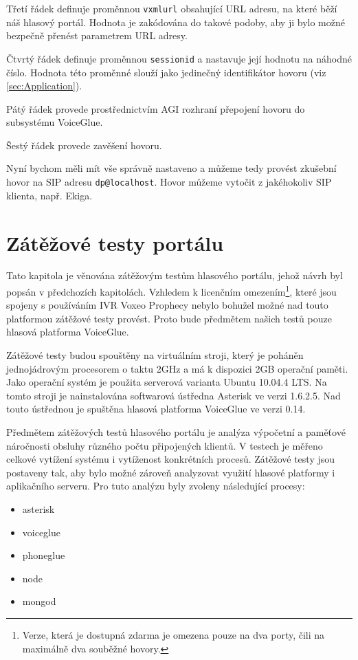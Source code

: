 \documentclass[ing,male,java,dept460,twoside]{diploma}						%
\begin{document}
Třetí řádek definuje proměnnou \texttt{vxmlurl} obsahující URL adresu, na které běží náš hlasový portál. Hodnota je zakódována do takové podoby, aby ji bylo možné bezpečně přenést parametrem URL adresy.

Čtvrtý řádek definuje proměnnou \texttt{sessionid} a nastavuje její hodnotu na náhodné číslo. Hodnota této proměnné slouží jako jedinečný identifikátor hovoru (viz \ref{sec:Application}).

Pátý řádek provede prostřednictvím AGI rozhraní přepojení hovoru do subsystému VoiceGlue.

Šestý řádek provede zavěšení hovoru.

Nyní bychom měli mít vše správně nastaveno a můžeme tedy provést zkušební hovor na SIP adresu \texttt{dp@localhost}. Hovor můžeme vytočit z jakéhokoliv SIP klienta, např. Ekiga.

\section{Zátěžové testy portálu}
\label{sec:Benchmark}
Tato kapitola je věnována zátěžovým testům hlasového portálu, jehož návrh byl popsán v předchozích kapitolách. Vzhledem k licenčním omezením\footnote{Verze, která je dostupná zdarma je omezena pouze na dva porty, čili na maximálně dva souběžné hovory.}, které jsou spojeny s používáním IVR Voxeo Prophecy nebylo bohužel možné nad touto platformou zátěžové testy provést. Proto bude předmětem našich testů pouze hlasová platforma VoiceGlue.

Zátěžové testy budou spouštěny na virtuálním stroji, který je poháněn jednojádrovým procesorem o taktu 2GHz a má k dispozici 2GB operační paměti. Jako operační systém je použita serverová varianta Ubuntu 10.04.4 LTS. Na tomto stroji je nainstalována softwarová ústředna Asterisk ve verzi 1.6.2.5. Nad touto ústřednou je spuštěna hlasová platforma VoiceGlue ve verzi 0.14.

Předmětem zátěžových testů hlasového portálu je analýza výpočetní a paměťové náročnosti obsluhy různého počtu připojených klientů. V testech je měřeno celkové vytížení systému i vytíženost konkrétních procesů. Zátěžové testy jsou postaveny tak, aby bylo možné zároveň analyzovat využití hlasové platformy i aplikačního serveru. Pro tuto analýzu byly zvoleny následující procesy:

\begin{itemize}
\item asterisk
\item voiceglue
\item phoneglue
\item node
\item mongod
\end{itemize}
\end{document}
